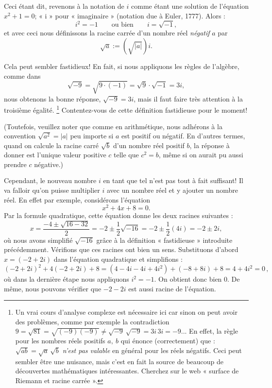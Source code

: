 Ceci étant dit, revenons à la notation de $i$ comme étant une solution de l'équation $  x^2 + 1 = 0$;  « i » pour « imaginaire » (notation due à Euler, 1777). Alors :
\[ i^2 = -1 \qquad \text{ou bien} \qquad i = \sqrt{-1}, \]
et avec ceci nous définissons la racine carrée d'un nombre réel \emph{négatif} $a$ par
$$\sqrt{a}:=(\sqrt{\vert a\vert}) i.$$

Cela peut sembler fastidieux! En fait, si nous appliquons les règles de l'algèbre, comme dans
$$
\sqrt{-9} = \sqrt{9 \cdot (-1)} = \sqrt{9} \cdot \sqrt{-1} = 3i,
$$ nous obtenons la bonne réponse, $\sqrt{-9}=3i$, mais il faut faire très attention à la troisième égalité.
\footnote{Un vrai cours d'analyse complexe est nécessaire ici car sinon on peut avoir des problèmes, comme par exemple la contradiction $9=\sqrt{81}=\sqrt{(-9)(-9)}\not=\sqrt{ -9 }\  \sqrt{ -9 }=3i\, 3i =-9$... En effet, la règle pour les nombres réels positifs $a,\  b$ qui énonce (correctement) que : $\sqrt{ab}=\sqrt{a}\,\sqrt{b}$ \emph{n'est pas valable} en général pour les réels négatifs. Ceci peut sembler être une nuisance, mais c'est en fait la source de beaucoup de découvertes mathématiques intéressantes. Cherchez sur le web « surface de Riemann et racine carrée ».}  Contentez-vous de cette définition fastidieuse pour le moment!

(Toutefois, veuillez noter que comme en arithmétique, nous adhérons à la convention $\sqrt{a^2} =\vert a \vert$ peu importe si $a$ est positif ou négatif. En d'autres termes, quand on calcule la racine carré $\sqrt{b}$ d'un nombre réel positif $b$, la réponse à donner est l'unique
valeur positive $c$ telle que $c^2=b$, même si on aurait pu aussi prendre $c$ négative.)



Cependant, le nouveau nombre $i$ en tant que tel n'est pas tout à fait suffisant! Il va falloir qu'on puisse multiplier $i$ avec un nombre réel et y ajouter un nombre réel. En effet par exemple, considérons l'équation
$$
x^2 + 4x + 8 = 0.
$$
Par la formule quadratique, cette équation donne les deux racines suivantes :
$$
x = \frac{-4 \pm \sqrt{16-32}}{2} = -2 \pm \frac12 \sqrt{-16} = -2 \pm \frac12 (4i) = -2 \pm 2i,
$$
où nous avons simplifié $\sqrt{-16}$ grâce à la définition « fastidieuse » introduite précédemment.
Vérifions que ces racines ont bien un sens. Substituons d'abord $x = (-2+2i)$ dans l'équation quadratique et simplifions :
$$
(-2+2i)^2 + 4(-2+2i) + 8 = (4 -4i - 4i + 4i^2) + (-8 +8i) +8 = 4+4i^2 = 0\,,
$$
où dans la dernière étape nous appliquons $i^2 = -1$. On obtient donc bien $0$. De même, nous
pouvons vérifier que $-2-2i$ est aussi racine de l'équation.




